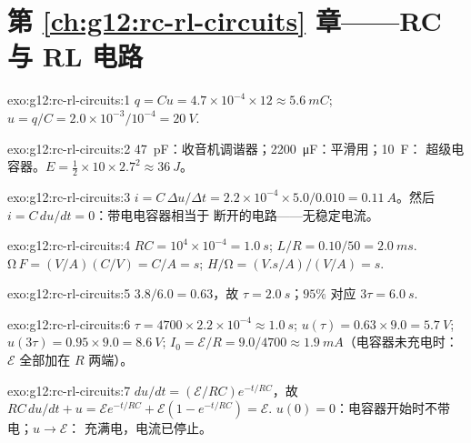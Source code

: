 \section*{第 \ref{ch:g12:rc-rl-circuits} 章——RC 与 RL 电路}

\begin{solution}{exo:g12:rc-rl-circuits:1}
$q = Cu = 4.7\times10^{-4} \times 12 \approx \qty{5.6}{mC}$;
$u = q/C = 2.0\times10^{-3}/10^{-4} = \qty{20}{V}$.
\end{solution}

\begin{solution}{exo:g12:rc-rl-circuits:2}
\qty{47}{pF}：收音机调谐器；\qty{2200}{\micro F}：平滑用；\qty{10}{F}：
超级电容器。$E = \tfrac12 \times 10 \times 2.7^2 \approx \qty{36}{J}$。
\end{solution}

\begin{solution}{exo:g12:rc-rl-circuits:3}
$i = C\,\Delta u/\Delta t = 2.2\times10^{-4} \times 5.0/0.010 =
\qty{0.11}{A}$。然后 $i = C\,du/dt = 0$：带电电容器相当于
断开的电路——无稳定电流。
\end{solution}

\begin{solution}{exo:g12:rc-rl-circuits:4}
$RC = 10^4 \times 10^{-4} = \qty{1.0}{s}$;
$L/R = 0.10/50 = \qty{2.0}{ms}$. $\unit{\ohm}\,\unit{F} =
(\unit{V/A})(\unit{C/V}) = \unit{C/A} = \unit{s}$;
$\unit{H}/\unit{\ohm} = (\unit{V.s/A})/(\unit{V/A}) = \unit{s}$.
\end{solution}

\begin{solution}{exo:g12:rc-rl-circuits:5}
$3.8/6.0 = 0.63$，故 $\tau = \qty{2.0}{s}$；$95\%$ 对应 $3\tau =
\qty{6.0}{s}$.
\end{solution}

\begin{solution}{exo:g12:rc-rl-circuits:6}
$\tau = 4700 \times 2.2\times10^{-4} \approx \qty{1.0}{s}$;
$u(\tau) = 0.63 \times 9.0 = \qty{5.7}{V}$;
$u(3\tau) = 0.95 \times 9.0 = \qty{8.6}{V}$;
$I_0 = \mathcal{E}/R = 9.0/4700 \approx \qty{1.9}{mA}$（电容器未充电时：
$\mathcal{E}$ 全部加在 $R$ 两端）。
\end{solution}

\begin{solution}{exo:g12:rc-rl-circuits:7}
$du/dt = (\mathcal{E}/RC)e^{-t/RC}$，故 $RC\,du/dt + u =
\mathcal{E}e^{-t/RC} + \mathcal{E}(1 - e^{-t/RC}) = \mathcal{E}$.
$u(0) = 0$：电容器开始时不带电；$u \to \mathcal{E}$：
充满电，电流已停止。
\end{solution}

